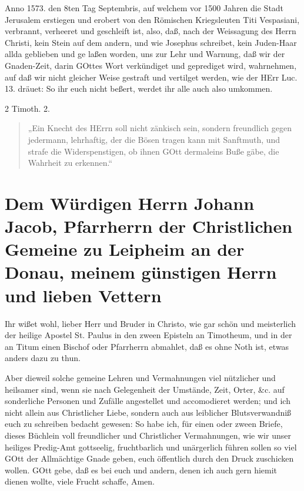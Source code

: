 Anno 1573. den 8ten Tag Septembris, auf welchem vor 1500 Jahren die Stadt Jerusalem erstiegen und erobert von den Römischen Kriegsleuten Titi Vespasiani, verbrannt, verheeret und geschleift ist, also, daß, nach der Weissagung des Herrn Christi, kein Stein auf dem andern, und wie Josephus schreibet, kein Juden-Haar allda geblieben und ge%
laßen worden, uns zur Lehr und Warnung, daß wir der Gnaden-Zeit, darin GOttes Wort verkündiget und geprediget wird, wahrnehmen, auf daß wir nicht gleicher Weise gestraft und vertilget werden, wie der HErr Luc. 13. dräuet: So ihr euch nicht beßert, werdet ihr alle auch also umkommen.

\begin{center}
2 Timoth. 2.
\end{center}

\begin{quote}
„Ein Knecht des HErrn soll nicht zänkisch sein, sondern freundlich gegen jedermann, lehrhaftig, der die Bösen tragen kann mit Sanftmuth, und strafe die Widerspenstigen, ob ihnen GOtt dermaleins Buße gäbe, die Wahrheit zu erkennen.“
\end{quote}

\section[Dem Würdigen Herrn Johann Jacob]{Dem Würdigen Herrn Johann Jacob, Pfarrherrn der Christlichen Gemeine zu Leipheim an der Donau, meinem günstigen Herrn und lieben Vettern}

Ihr wißet wohl, lieber Herr und Bruder in Christo, wie gar schön und meisterlich der heilige Apostel St. Paulus in den zween Episteln an Timotheum, und in der an Titum einen Bischof oder Pfarrherrn abmahlet, daß es ohne Noth ist, etwas anders dazu zu thun.

Aber dieweil solche gemeine Lehren und Vermahnungen viel nützlicher und heilsamer sind, wenn sie nach Gelegenheit der Umstände, Zeit, Orter, \&c. auf sonderliche Personen und Zufälle angestellet und accomodieret werden; und ich nicht allein aus Christlicher Liebe, sondern auch aus leiblicher Blutsverwandniß euch zu schreiben bedacht gewesen: So habe ich, für einen oder zween Briefe, dieses Büchlein voll freundlicher und Christlicher Vermahnungen, wie wir unser heiliges Predig-Amt gottseelig, fruchtbarlich und unärgerlich führen sollen so viel GOtt der Allmächtige Gnade geben, euch öffentlich durch den Druck zuschicken wollen. GOtt gebe, daß es bei euch und andern, denen ich auch gern hiemit dienen wollte, viele Frucht schaffe, Amen.

